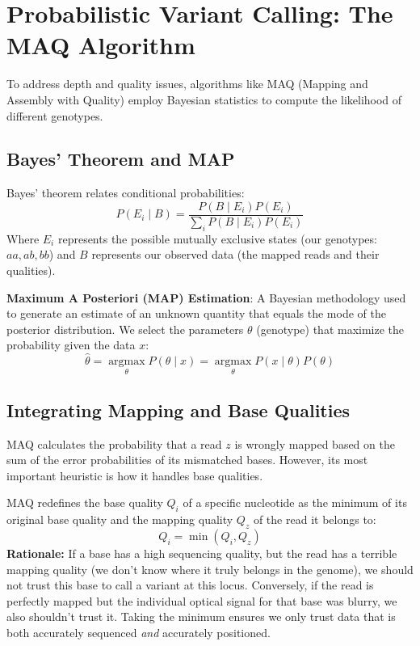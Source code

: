 \section{Probabilistic Variant Calling: The MAQ Algorithm}

To address depth and quality issues, algorithms like MAQ (Mapping and Assembly with Quality) employ Bayesian statistics to compute the likelihood of different genotypes.

\subsection{Bayes' Theorem and MAP}

Bayes' theorem relates conditional probabilities:
\[
P(E_i \mid B) = \frac{P(B \mid E_i) P(E_i)}{\sum_i P(B \mid E_i) P(E_i)}
\]
Where $E_i$ represents the possible mutually exclusive states (our genotypes: $aa, ab, bb$) and $B$ represents our observed data (the mapped reads and their qualities).

\begin{important}
  \textbf{Maximum A Posteriori (MAP) Estimation}: A Bayesian methodology used to generate an estimate of an unknown quantity that equals the mode of the posterior distribution. We select the parameters $\theta$ (genotype) that maximize the probability given the data $x$:
  \[
  \hat{\theta} = \underset{\theta}{\operatorname{argmax}} P(\theta \mid x) = \underset{\theta}{\operatorname{argmax}} P(x \mid \theta) P(\theta)
  \]
\end{important}

\subsection{Integrating Mapping and Base Qualities}

MAQ calculates the probability that a read $z$ is wrongly mapped based on the sum of the error probabilities of its mismatched bases. However, its most important heuristic is how it handles base qualities.

MAQ redefines the base quality $Q_i$ of a specific nucleotide as the minimum of its original base quality and the mapping quality $Q_z$ of the read it belongs to:
\[
Q_i = \min(Q_i, Q_z)
\]
\textbf{Rationale:} If a base has a high sequencing quality, but the read has a terrible mapping quality (we don't know where it truly belongs in the genome), we should not trust this base to call a variant at this locus. Conversely, if the read is perfectly mapped but the individual optical signal for that base was blurry, we also shouldn't trust it. Taking the minimum ensures we only trust data that is both accurately sequenced \textit{and} accurately positioned.

